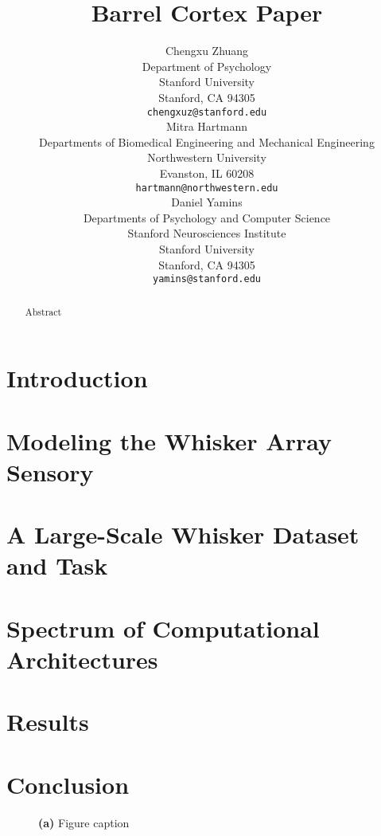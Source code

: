 \documentclass{article} %
\title{Barrel Cortex Paper}
\author{
Chengxu Zhuang\\
Department of Psychology\\
Stanford University\\
Stanford, CA 94305 \\
\texttt{chengxuz@stanford.edu} \\
\And
Mitra Hartmann \\
Departments of Biomedical Engineering and Mechanical Engineering \\
Northwestern University \\
Evanston, IL  60208\\
\texttt{hartmann@northwestern.edu} \\
\And
Daniel Yamins \\
Departments of Psychology and Computer Science \\
Stanford Neurosciences Institute \\
Stanford University \\
Stanford, CA 94305 \\
\texttt{yamins@stanford.edu} \\
}
\begin{document}
\maketitle

\begin{abstract}
Abstract
\end{abstract}


\section{Introduction} %


\section{Modeling the Whisker Array Sensory} %


\section{A Large-Scale Whisker Dataset and Task} %


\section{Spectrum of Computational Architectures} %


\section{Results} %


\section{Conclusion}  %


\begin{figure}[h]
\centering
\vspace{-2mm}
\caption{\textbf{(a)} Figure caption~\label{figname}}
\end{figure}


{\small
}

\end{document}
